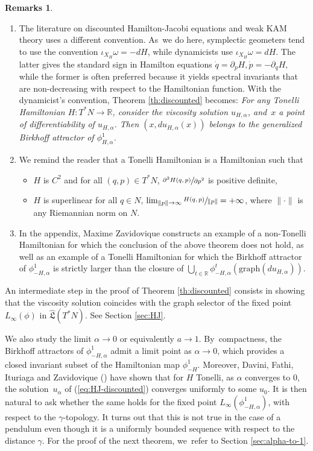 \documentclass[JEP,XML,SOM,Unicode,NoFloatCountersInSection,published]{cedram}
\theoremstyle{definition}
\newtheorem{rems}[thm]{Remarks}
\newcommand{\R}{\mathbb{R}}
\newcommand{\fL}{\mathfrak {L}}
\newcommand{\hatL}{\widehat{\fL}}
\begin{document}
\skpt
\begin{rems}
\begin{enumerate}
\item The literature on discounted Hamilton-Jacobi equations and weak KAM theory uses a different convention. As~we do here, symplectic geometers tend to use the convention $\iota_{X_H}\omega=-dH$, while dynamicists use $\iota_{X_H}\omega=dH$. The latter gives the standard sign in Hamilton equations $\dot q=\partial_pH, \dot p=-\partial_qH$, while the former is often preferred because it yields spectral invariants that are non-decreasing with respect to the Hamiltonian function.
With the dynamicist's convention, Theorem \ref{th:discounted} becomes: \emph{For any Tonelli Hamiltonian $H:T^*N\to\R$, consider the viscosity solution $u_{H,\alpha}$, and~$x$ a point of differentiability of $u_{H, \alpha}$. Then $(x,du_{H,\alpha}(x))$ belongs to the generalized Birkhoff attractor of $\phi_{H,\alpha}^1$.}
\item We remind the reader that a Tonelli Hamiltonian is a Hamiltonian such that
\begin{itemize}
\item $H$ is $C^2$ and for all $(q, p)\in T^*N$, $\sfrac{\partial^2 H(q,p)}{\partial p^2}$ is positive definite,
\item $H$ is superlinear \ie for all $q\in N$, $\lim_{\| p\|\to\infty} \sfrac{H(q, p)}{\| p\|}=+\infty$, where $\|\cdot\|$ is any Riemannian norm on $N$.
\end{itemize}
\item
In the appendix, Maxime Zavidovique constructs an example of a non-Tonelli Hamiltonian for which the conclusion of the above theorem does not hold, as well as an example of a Tonelli Hamiltonian for which the Birkhoff attractor of $\phi_{-H,\alpha}^1$ is strictly larger than the closure of $\bigcup_{t\in\R}\phi_{-H,\alpha}^t(\mathrm{graph}(du_{H, \alpha}))$.
\end{enumerate}
\end{rems}
An intermediate step in the proof of Theorem \ref{th:discounted} consists in showing that the viscosity solution coincides with the graph selector of the fixed point $L_\infty(\phi)$ in $\hatL(T^*N)$. See Section \ref{sec:HJ}.

We also study the limit $\alpha \to 0$ or equivalently $a\to 1$. By~compactness, the Birkhoff attractors of $\phi_{-H,\alpha}^1$ admit a limit point as $\alpha\to 0$, which provides a closed invariant subset of the Hamiltonian map $\phi_{-H}^1$. Moreover,
Davini, Fathi, Ituriaga and Zavidovique (\cite{DFIZ}) have shown that for $H$ Tonelli, as $\alpha$ converges to $0$, the solution~$u_\alpha$ of (\ref{eq:HJ-discounted}) converges uniformly to some $u_0$.
It is then natural to ask whether the same holds for the fixed point $L_\infty(\phi_{-H,\alpha}^1)$, with respect to the $\gamma$\nobreakdash-topology. It turns out that this is not true in the case of a pendulum even though it is a uniformly bounded sequence with respect to the distance $\gamma$. For the proof of the next theorem, we~refer to Section \ref{sec:alpha-to-1}.
\end{document}
